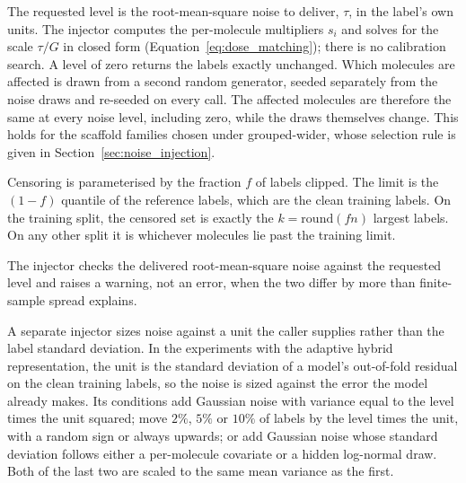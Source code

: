 The requested level is the root-mean-square noise to deliver, $\tau$, in the label's own units. The
injector computes the per-molecule multipliers $s_i$ and solves for the scale $\tau / G$ in closed
form (Equation~\ref{eq:dose_matching}); there is no calibration search. A level of zero returns the
labels exactly unchanged. Which molecules are affected is drawn from a second random generator,
seeded separately from the noise draws and re-seeded on every call. The affected molecules are
therefore the same at every noise level, including zero, while the draws themselves change. This
holds for the scaffold families chosen under grouped-wider, whose selection rule is given in
Section~\ref{sec:noise_injection}.

Censoring is parameterised by the fraction $f$ of labels clipped. The limit is the $(1-f)$ quantile
of the reference labels, which are the clean training labels. On the training split, the censored
set is exactly the $k = \mathrm{round}(fn)$ largest labels. On any other split it is whichever
molecules lie past the training limit.

The injector checks the delivered root-mean-square noise against the requested level and raises a
warning, not an error, when the two differ by more than finite-sample spread explains.

A separate injector sizes noise against a unit the caller supplies rather than the label standard
deviation. In the experiments with the adaptive hybrid representation, the unit is the standard deviation of a model's out-of-fold residual on
the clean training labels, so the noise is sized against the error the model already makes. Its
conditions add Gaussian noise with variance equal to the level times the unit squared; move $2\%$,
$5\%$ or $10\%$ of labels by the level times the unit, with a random sign or always upwards; or add
Gaussian noise whose standard deviation follows either a per-molecule covariate or a hidden
log-normal draw. Both of the last two are scaled to the same mean variance as the first.

